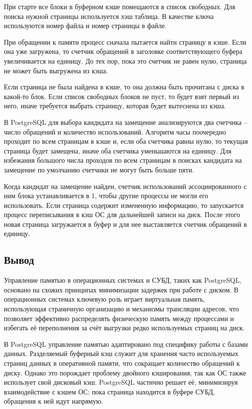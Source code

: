 При старте все блоки в буферном кэше помещаются в список свободных.
Для поиска нужной страницы используется хэш таблица.
В качестве ключа используются номер файла и номер страницы в файле.

При обращении к памяти процесс сначала пытается найти страницу в кэше.
Если она уже загружена, то счетчик обращений в заголовке соответствующего буфера увеличивается на единицу.
До тех пор, пока это счетчик не равен нулю, страница не может быть выгружена из кэша.

Если страница не была найдена в кэше, то она должна быть прочитана с диска в какой-то блок.
Если список свободных блоков не пуст, то будет взят первый из него, иначе требуется выбрать страницу, которая будет вытеснена из кэша.

В PostgreSQL для выбора кандидата на замещение анализируются два счетчика -- число обращений и количество использований.
Алгоритм часы поочередно проходит по всем страницам в кэше и, если оба счетчика равны нулю, то текущая страница будет замещена, иначе оба счетчика уменьшаются на единицу.
Для избежания большого числа проходов по всем страницам в поисках кандидата на замещение по умолчанию счетчики не могут быть больше пяти.

Когда кандидат на замещение найден, счетчик использований ассоциированного с ним блока устанавливается в 1, чтобы другие процессы не могли его использовать.
Если страница содержит измененную информацию, то запускается процесс переписывания в кэш ОС для дальнейшей записи на диск.
После этого новая страница загружается в буфер и для нее выставляется счетчик обращений в единицу.

\subsection{Вывод}
Управление памятью в операционных системах и СУБД, таких как PostgreSQL, основано на схожих принципах минимизации задержек при работе с диском.
В операционных системах ключевую роль играет виртуальная память, использующая страничную организацию и механизмы трансляции адресов, что позволяет эффективно распределять физическую память между процессами и избегать её переполнения за счёт выгрузки редко используемых страниц на диск. 

В PostgreSQL управление памятью адаптировано под специфику работы с базами данных. 
Разделяемый буферный кэш служит для хранения часто используемых страниц данных в оперативной памяти, что сокращает количество обращений к диску.
Однако это порождает проблему двойного кэширования, так как ОС также использует свой дисковый кэш.
PostgreSQL частично решает её, минимизируя взаимодействие с кэшем ОС: пока страница находится в буфере СУБД, обращения к ней идут напрямую.

